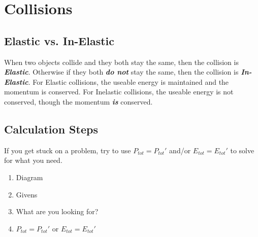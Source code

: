 \documentclass{article}
\begin{document}
\section{Collisions}
\begin{adjustwidth}{1cm}{0pt}
    \subsection*{Elastic vs. In-Elastic}
    \begin{adjustwidth}{0.5cm}{0pt}
        When two objects collide and they both stay the same, then the collision is \textbf{\textit{Elastic}}.
        Otherwise if they both \textbf{\textit{do not}} stay the same, then the collision is \textbf{\textit{In-Elastic}}.\newline\newline
        For Elastic collisions, the useable energy is maintained and the momentum is conserved.
        For Inelastic collisions, the useable energy is not conserved, though the momentum \textbf{\textit{is}} conserved.
    \end{adjustwidth}
    \subsection*{Calculation Steps}
    \begin{flushleft}
        If you get stuck on a problem, try to use $P_{tot} = P_{tot}\prime$ and/or $E_{tot} = E_{tot}\prime$ to solve for what you need.
    \end{flushleft}
    \vspace*{5pt}
    \begin{adjustwidth}{0.5cm}{0pt}
        \begin{enumerate}
            \item Diagram
            \item Givens
            \item What are you looking for?
            \item $P_{tot} = P_{tot}\prime$ or $E_{tot} = E_{tot}\prime$
        \end{enumerate}
    \end{adjustwidth}
\end{adjustwidth}
\end{document}
